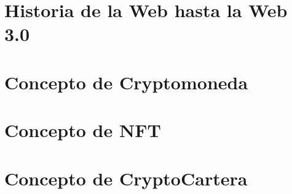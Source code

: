 \section{Historia de la Web hasta la Web 3.0}

\section{Concepto de Cryptomoneda}

\section{Concepto de NFT}


\newpage
\section{Concepto de CryptoCartera}
